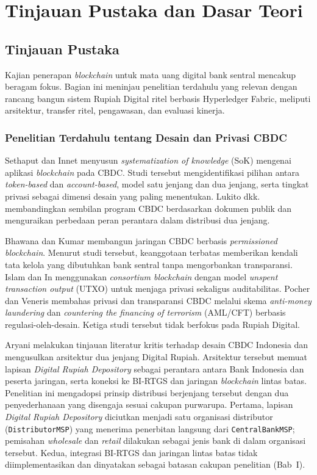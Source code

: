 \chapter{Tinjauan Pustaka dan Dasar Teori}

\section{Tinjauan Pustaka}

Kajian penerapan \textit{blockchain} untuk mata uang digital bank sentral
mencakup beragam fokus. Bagian ini meninjau penelitian terdahulu yang relevan
dengan rancang bangun sistem Rupiah Digital ritel berbasis Hyperledger Fabric,
meliputi arsitektur, transfer ritel, pengawasan, dan evaluasi kinerja.

\subsection{Penelitian Terdahulu tentang Desain dan Privasi CBDC}

Sethaput dan Innet \cite{sethaput2025} menyusun \textit{systematization of
knowledge} (SoK) mengenai aplikasi \textit{blockchain} pada CBDC. Studi tersebut
mengidentifikasi pilihan antara \textit{token-based} dan \textit{account-based},
model satu jenjang dan dua jenjang, serta tingkat privasi sebagai dimensi desain
yang paling menentukan. Lukito dkk. \cite{lukito2026governance} membandingkan
sembilan program CBDC berdasarkan dokumen publik dan menguraikan perbedaan peran
perantara dalam distribusi dua jenjang.

Bhawana dan Kumar \cite{bhawana2021} membangun jaringan CBDC berbasis
\textit{permissioned blockchain}. Menurut studi tersebut, keanggotaan terbatas
memberikan kendali tata kelola yang dibutuhkan bank sentral tanpa mengorbankan
transparansi. Islam dan In \cite{islam2023} menggunakan \textit{consortium
blockchain} dengan model \textit{unspent transaction output} (UTXO) untuk menjaga
privasi sekaligus auditabilitas. Pocher dan Veneris \cite{Pocher2022Privacy}
membahas privasi dan transparansi CBDC melalui skema \textit{anti-money
laundering} dan \textit{countering the financing of terrorism} (AML/CFT) berbasis
regulasi-oleh-desain. Ketiga studi tersebut tidak berfokus pada Rupiah Digital.

Aryani \cite{aryani2023critlit} melakukan tinjauan literatur kritis terhadap desain
CBDC Indonesia dan mengusulkan arsitektur dua jenjang Digital Rupiah. Arsitektur
tersebut memuat lapisan \textit{Digital Rupiah Depository} sebagai perantara antara
Bank Indonesia dan peserta jaringan, serta koneksi ke BI-RTGS dan jaringan
\textit{blockchain} lintas batas. Penelitian ini mengadopsi prinsip distribusi
berjenjang tersebut dengan dua penyederhanaan yang disengaja sesuai cakupan
purwarupa. Pertama, lapisan \textit{Digital Rupiah Depository} diciutkan menjadi
satu organisasi distributor (\texttt{DistributorMSP}) yang menerima penerbitan
langsung dari \texttt{CentralBankMSP}; pemisahan \textit{wholesale} dan
\textit{retail} dilakukan sebagai jenis bank di dalam organisasi tersebut. Kedua,
integrasi BI-RTGS dan jaringan lintas batas tidak diimplementasikan dan dinyatakan
sebagai batasan cakupan penelitian (Bab~I).

